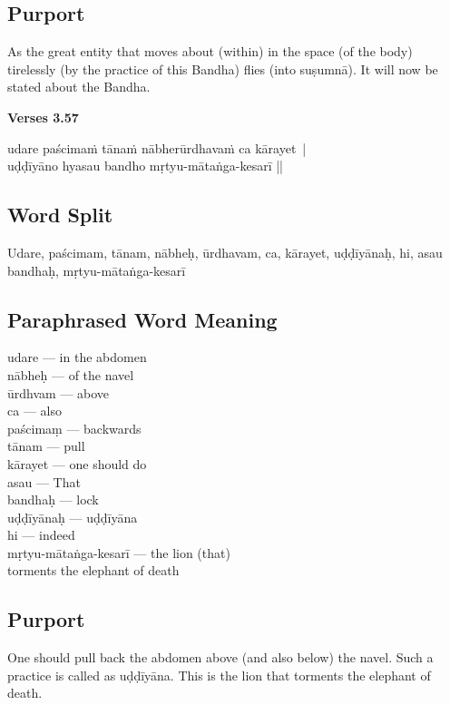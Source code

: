 \subsection*{Purport}

As the great entity that moves about (within) in the space (of the body) tirelessly (by the practice of this Bandha) flies (into suṣumnā). It will now be stated about the Bandha.

\noindent \textbf{Verses 3.57}

\begin{shloka}
udare paścimaṁ tānaṁ nābherūrdhavaṁ ca kārayet |\\
uḍḍīyāno hyasau bandho mṛtyu-mātaṅga-kesarī ||
\end{shloka}

\subsection*{Word Split}

Udare, paścimam, tānam, nābheḥ, ūrdhavam, ca, kārayet, uḍḍīyānaḥ, hi, asau bandhaḥ, mṛtyu-mātaṅga-kesarī

\subsection*{Paraphrased Word Meaning}

\begin{multicols}{2}
udare --- in the abdomen \\
nābheḥ --- of the navel \\
ūrdhvam --- above \\
ca --- also \\
paścimaṃ --- backwards \\
tānam --- pull \\
kārayet --- one should do \\
asau --- That \\
bandhaḥ --- lock \\
uḍḍīyānaḥ --- uḍḍīyāna \\
hi --- indeed \\
mṛtyu-mātaṅga-kesarī --- the lion (that) \\
torments the elephant of death
\end{multicols}

\subsection*{Purport}

One should pull back the abdomen above (and also below) the navel. Such a practice is called as uḍḍīyāna. This is the lion that torments the elephant of death. 

